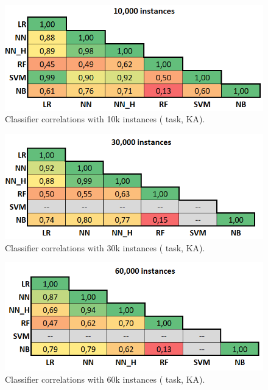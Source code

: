 \begin{figure}[H]
	\centering
	\includegraphics[scale=0.5]{images/corr_wc_ka_10000}
	\caption[Classifier correlations with 10k instances ( task, KA)]
		{Classifier correlations with 10k instances ( task, KA).}
\end{figure}

\begin{figure}[H]
	\centering
	\includegraphics[scale=0.5]{images/corr_wc_ka_30000}
	\caption[Classifier correlations with 30k instances ( task, KA)]
		{Classifier correlations with 30k instances ( task, KA).}
\end{figure}

\begin{figure}[H]
	\centering
	\includegraphics[scale=0.5]{images/corr_wc_ka_60000}
	\caption[Classifier correlations with 60k instances ( task, KA)]
		{Classifier correlations with 60k instances ( task, KA).}
\end{figure}